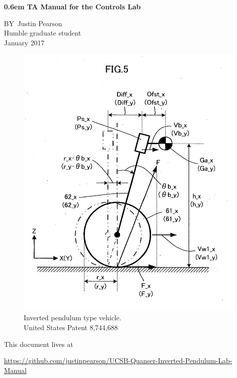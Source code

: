 \documentclass{book}
\begin{document}
\clearpage
\newcommand\nbvspace[1][3]{\vspace*{\stretch{#1}}}
\newcommand\nbstretchyspace{\spaceskip0.5em plus 0.25em minus 0.25em}
\newcommand{\nbtitlestretch}{\spaceskip0.6em}
\pagestyle{empty}
\begin{center}
\bfseries
\nbvspace[1]
\Huge
{\nbtitlestretch\huge
TA Manual for the Controls Lab}

\nbvspace[1]
\normalsize

\nbvspace[1]
\small BY\    \Large Justin Pearson\\[0.5em]
\footnotesize Humble graduate student \\ January 2017

\nbvspace[2]



\begin{figure}[H]
\centering
\includegraphics[width=.5\textwidth]{./Images/imgf0005.png}
  \caption{Inverted pendulum type vehicle. \\ United States Patent 8,744,688}
\end{figure}
\nbvspace[3]
\normalsize

This document lives at 

\url{https://github.com/justinpearson/UCSB-Quanser-Inverted-Pendulum-Lab-Manual}

\nbvspace[1]

\cleardoublepage  %


\end{center}
\end{document}
